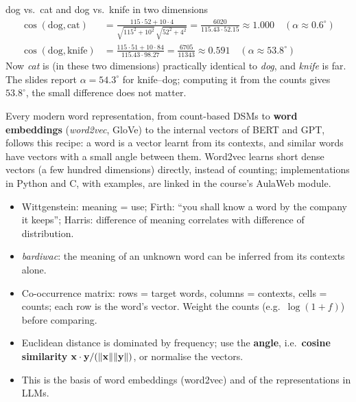\begin{nbexample}{dog vs.\ cat and dog vs.\ knife in two dimensions}
\begin{align*}
  \cos(\text{dog}, \text{cat}) &= \frac{115\cdot 52 + 10\cdot 4}{\sqrt{115^2+10^2}\,\sqrt{52^2+4^2}}
     = \frac{6020}{115.43 \cdot 52.15} \approx 1.000 \quad(\alpha \approx 0.6^\circ)\\
  \cos(\text{dog}, \text{knife}) &= \frac{115\cdot 51 + 10\cdot 84}{115.43 \cdot 98.27}
     = \frac{6705}{11343} \approx 0.591 \quad(\alpha \approx 53.8^\circ)
\end{align*}
Now \emph{cat} is (in these two dimensions) practically identical to \emph{dog}, and
\emph{knife} is far. The slides report $\alpha = 54.3^\circ$ for knife--dog; computing it
from the counts gives $53.8^\circ$, the small difference does not matter.
\end{nbexample}

\begin{nbwhy}
Every modern word representation, from count-based DSMs to \textbf{word embeddings}
(\emph{word2vec}, GloVe) to the internal vectors of BERT and GPT, follows this recipe:
a word is a vector learnt from its contexts, and similar words have vectors with a small
angle between them. Word2vec learns short dense vectors (a few hundred dimensions)
directly, instead of counting; implementations in Python and C, with examples, are linked
in the course's AulaWeb module.
\end{nbwhy}

\begin{nbsummary}
\begin{itemize}[nosep]
  \item Wittgenstein: meaning = use; Firth: ``you shall know a word by the company it
        keeps''; Harris: difference of meaning correlates with difference of
        distribution.
  \item \emph{bardiwac}: the meaning of an unknown word can be inferred from its
        contexts alone.
  \item Co-occurrence matrix: rows = target words, columns = contexts, cells = counts;
        each row is the word's vector. Weight the counts (e.g.\ $\log(1+f)$) before
        comparing.
  \item Euclidean distance is dominated by frequency; use the \textbf{angle}, i.e.\
        \textbf{cosine similarity} $\mathbf{x}\cdot\mathbf{y}/(\lVert \mathbf{x}\rVert\lVert \mathbf{y}\rVert)$,
        or normalise the vectors.
  \item This is the basis of word embeddings (word2vec) and of the representations in
        LLMs.
\end{itemize}
\end{nbsummary}
